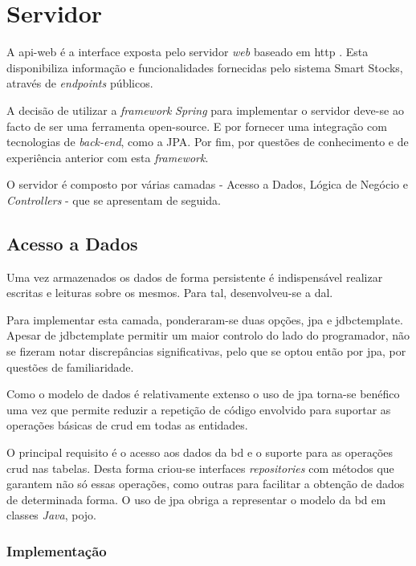 \section{Servidor}\label{sec42}

A \gls{api-web} é a interface exposta pelo servidor \textit{web} baseado em \acrfull{http} \cite{RFC7231:http}. Esta disponibiliza informação e funcionalidades fornecidas pelo sistema Smart Stocks, através de \textit{endpoints} públicos.

A decisão de utilizar a \textit{framework} \textit{Spring} para implementar o servidor deve-se ao facto de ser uma ferramenta \gls{open-source}. E por fornecer uma integração com tecnologias de \textit{back-end}, como a JPA. Por fim, por questões de conhecimento e de experiência anterior com esta \textit{framework}.

O servidor é composto por várias camadas - Acesso a Dados, Lógica de Negócio e \textit{Controllers} - que se apresentam de seguida.

%
%
\subsection{Acesso a Dados}\label{subsec421}

Uma vez armazenados os dados de forma persistente é indispensável realizar escritas e leituras sobre os mesmos. Para tal, desenvolveu-se a \acrfull{dal}. 

Para implementar esta camada, ponderaram-se duas opções, \gls{jpa} e \gls{jdbctemplate}. Apesar de \acrshort{jdbctemplate} permitir um maior controlo do lado do programador, não se fizeram notar discrepâncias significativas, pelo que se optou então por \acrshort{jpa}, por questões de familiaridade.

Como o modelo de dados é relativamente extenso o uso de \acrshort{jpa} torna-se benéfico uma vez que permite reduzir a repetição de código envolvido para suportar as operações básicas de \acrfull{crud} em todas as entidades. 

O principal requisito é o acesso aos dados da \acrshort{bd} e o suporte para as operações \acrshort{crud} nas tabelas. Desta forma criou-se interfaces \textit{repositories} com métodos que garantem não só essas operações, como outras para facilitar a obtenção de dados de determinada forma. O uso de \acrshort{jpa} obriga a representar o modelo da \acrshort{bd} em classes \textit{Java}, \acrfull{pojo}.

\subsubsection{Implementação}\label{subsubsec4211}

